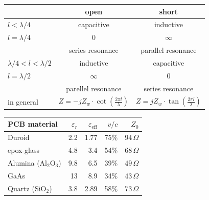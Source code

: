 \begin{tabular}{|l|c|c|} \hline
                    & open         & short              \\ \hline \hline
 $l<\lambda/4$      & capacitive   & inductive          \\ \hline
 $l=\lambda/4$      & 0            &$\infty$            \\ 
                    & series resonance & parallel resonance \\ \hline
 $\lambda/4<l<\lambda/2$ & inductive   & capacitive    \\    \hline
 $l=\lambda/2$      &$\infty$          &0              \\
                    & parellel resonance & series resonance \\ \hline
 in general         &$ Z=-jZ_w\cdot \cot\left(\frac{2\pi l}{\lambda}\right)$
                    &$ Z=jZ_w\cdot \tan\left(\frac{2\pi l}{\lambda }\right)$\\
                    \hline
\end{tabular}
\begin{tabular}{|l|r|r|r|r|} \hline
PCB material & $\varepsilon_r$ & $\varepsilon_{\text{eff}}$
& $v/c$ & $Z_0$ \\ \hline \hline
Duroid                & 2.2 & 1.77 & 75\% & $94\,\Omega$ \\ \hline
epox-glass            & 4.8 & 3.4  & 54\% & $68\,\Omega$ \\ \hline
Alumina (Al$_2$O$_3$) & 9.8 & 6.5  & 39\% & $49\,\Omega$ \\ \hline
GaAs                  & 13  & 8.9  & 34\% & $43\,\Omega$ \\ \hline
Quartz (SiO$_2$)      & 3.8 & 2.89 & 58\% & $73\,\Omega$ \\ \hline
\end{tabular}

